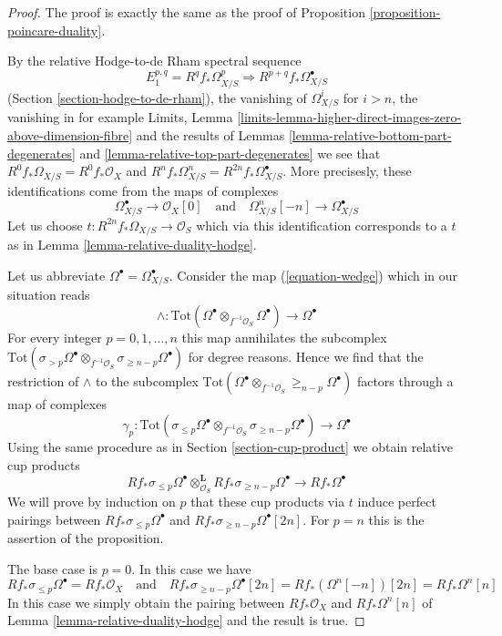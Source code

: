 \begin{proof}
The proof is exactly the same as the proof of
Proposition \ref{proposition-poincare-duality}.

\medskip\noindent
By the relative Hodge-to-de Rham spectral sequence
$$
E_1^{p, q} = R^qf_*\Omega^p_{X/S} \Rightarrow R^{p + q}f_*\Omega^\bullet_{X/S}
$$
(Section \ref{section-hodge-to-de-rham}), the vanishing
of $\Omega^i_{X/S}$ for $i > n$, the vanishing in for example Limits, Lemma
\ref{limits-lemma-higher-direct-images-zero-above-dimension-fibre}
and the results of Lemmas \ref{lemma-relative-bottom-part-degenerates} and
\ref{lemma-relative-top-part-degenerates}
we see that $R^0f_*\Omega_{X/S} = R^0f_*\mathcal{O}_X$
and $R^nf_*\Omega^n_{X/S} = R^{2n}f_*\Omega^\bullet_{X/S}$.
More precisesly, these identifications come from the maps
of complexes
$$
\Omega^\bullet_{X/S} \to \mathcal{O}_X[0]
\quad\text{and}\quad
\Omega^n_{X/S}[-n] \to \Omega^\bullet_{X/S}
$$
Let us choose $t : R^{2n}f_*\Omega_{X/S} \to \mathcal{O}_S$
which via this identification corresponds to a $t$ as in
Lemma \ref{lemma-relative-duality-hodge}.

\medskip\noindent
Let us abbreviate $\Omega^\bullet = \Omega^\bullet_{X/S}$.
Consider the map (\ref{equation-wedge}) which in our situation reads
$$
\wedge :
\text{Tot}(\Omega^\bullet \otimes_{f^{-1}\mathcal{O}_S} \Omega^\bullet)
\longrightarrow
\Omega^\bullet
$$
For every integer $p = 0, 1, \ldots, n$ this map annihilates the subcomplex
$\text{Tot}(\sigma_{> p} \Omega^\bullet \otimes_{f^{-1}\mathcal{O}_S}
\sigma_{\geq n - p} \Omega^\bullet)$ for degree reasons.
Hence we find that the restriction of $\wedge$ to the subcomplex
$\text{Tot}(\Omega^\bullet \otimes_{f^{-1}\mathcal{O}_S}
\geq_{n - p}\Omega^\bullet)$ factors through a map of complexes
$$
\gamma_p :
\text{Tot}(\sigma_{\leq p} \Omega^\bullet \otimes_{f^{-1}\mathcal{O}_S}
\sigma_{\geq n - p} \Omega^\bullet)
\longrightarrow
\Omega^\bullet
$$
Using the same procedure as in Section \ref{section-cup-product} we obtain
relative cup products
$$
Rf_*\sigma_{\leq p} \Omega^\bullet
\otimes_{\mathcal{O}_S}^\mathbf{L}
Rf_*\sigma_{\geq n - p}\Omega^\bullet
\longrightarrow
Rf_*\Omega^\bullet
$$
We will prove by induction on $p$ that these cup products via $t$
induce perfect pairings between $Rf_*\sigma_{\leq p} \Omega^\bullet$
and $Rf_*\sigma_{\geq n - p}\Omega^\bullet[2n]$. For $p = n$
this is the assertion of the proposition.

\medskip\noindent
The base case is $p = 0$. In this case we have
$$
Rf_*\sigma_{\leq p}\Omega^\bullet = Rf_*\mathcal{O}_X
\quad\text{and}\quad
Rf_*\sigma_{\geq n - p}\Omega^\bullet[2n] = Rf_*(\Omega^n[-n])[2n] =
Rf_*\Omega^n[n]
$$
In this case we simply obtain the pairing
between $Rf_*\mathcal{O}_X$ and $Rf_*\Omega^n[n]$ of
Lemma \ref{lemma-relative-duality-hodge} and the result is true.


\end{proof}

